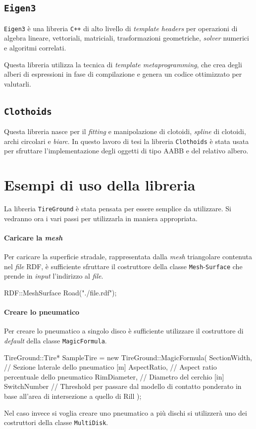\subsection{\texttt{Eigen3}}
\texttt{Eigen3} è una libreria \texttt{C++} di alto livello di \textit{template headers} per operazioni di algebra lineare, vettoriali, matriciali, trasformazioni geometriche, \textit{solver} numerici e algoritmi correlati.

Questa libreria utilizza la tecnica di \textit{template metaprogramming}, che crea degli alberi di espressioni in fase di compilazione e genera un codice ottimizzato per valutarli.
%
\subsection{\texttt{Clothoids}}
Questa libreria nasce per il \textit{fitting} e manipolazione di clotoidi, \textit{spline} di clotoidi, archi circolari e \textit{biarc}. In questo lavoro di tesi la libreria \texttt{Clothoids} è stata usata per sfruttare l'implementazione degli oggetti di tipo \ac{AABB} e del relativo albero.
%
\section{Esempi di uso della libreria}
La libreria \texttt{TireGround} è stata pensata per essere semplice da utilizzare. Si vedranno ora i vari passi per utilizzarla in maniera appropriata.
%
\paragraph{Caricare la \textit{mesh}}
Per caricare la superficie stradale, rappresentata dalla \textit{mesh} triangolare contenuta nel \textit{file} \ac{RDF}, è sufficiente sfruttare il costruttore della classe \texttt{Mesh}-\texttt{Surface} che prende in \textit{input} l'indirizzo al \textit{file}.
\begin{pseudoc}
	RDF::MeshSurface Road("./file.rdf");
\end{pseudoc}
%
\paragraph{Creare lo pneumatico}
Per creare lo pneumatico a singolo disco è sufficiente utilizzare il costruttore di \textit{default} della classe \texttt{MagicFormula}.
\begin{pseudoc}
	TireGround::Tire* SampleTire = new TireGround::MagicFormula(
		SectionWidth, // Sezione laterale dello pneumatico [m]
		AspectRatio,  // Aspect ratio percentuale dello pneumatico
		RimDiameter,  // Diametro del cerchio [in]
		SwitchNumber  // Threshold per passare dal modello di contatto ponderato in base all'area di intersezione a quello di Rill 
		);
\end{pseudoc}
Nel caso invece si voglia creare uno pneumatico a più dischi si utilizzerà uno dei costruttori della classe \texttt{MultiDisk}.

